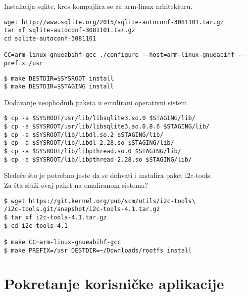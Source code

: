 \documentclass{article}
\begin{document}
Instalacija sqlite, kros kompajlira se za arm-linux arhitekturu.

\begin{commandline}
  \begin{verbatim}
wget http://www.sqlite.org/2015/sqlite-autoconf-3081101.tar.gz
tar xf sqlite-autoconf-3081101.tar.gz
cd sqlite-autoconf-3081101

CC=arm-linux-gnueabihf-gcc ./configure --host=arm-linux-gnueabihf --prefix=/usr
  \end{verbatim}
\end{commandline}

\begin{commandline}
  \begin{verbatim}
$ make DESTDIR=$SYSROOT install
$ make DESTDIR=$STAGING install
  \end{verbatim}
\end{commandline}

Dodavanje neophodnih paketa u emulirani operativni sistem.

\begin{commandline}
  \begin{verbatim}
$ cp -a $SYSROOT/usr/lib/libsqlite3.so.0 $STAGING/lib/
$ cp -a $SYSROOT/usr/lib/libsqlite3.so.0.8.6 $STAGING/lib/
$ cp -a $SYSROOT/lib/libdl.so.2 $STAGING/lib/
$ cp -a $SYSROOT/lib/libdl-2.28.so $STAGING/lib/
$ cp -a $SYSROOT/lib/libpthread.so.0 $STAGING/lib/
$ cp -a $SYSROOT/lib/libpthread-2.28.so $STAGING/lib/
  \end{verbatim}
\end{commandline}



Sledeće što je potrebno jeste da se dohvati i instalira paket i2c-tools. \\

Za šta služi ovaj paket na emuliranom sistemu?

\begin{commandline}
  \begin{verbatim}
$ wget https://git.kernel.org/pub/scm/utils/i2c-tools\
/i2c-tools.git/snapshot/i2c-tools-4.1.tar.gz
$ tar xf i2c-tools-4.1.tar.gz
$ cd i2c-tools-4.1

$ make CC=arm-linux-gnueabihf-gcc
$ make PREFIX=/usr DESTDIR=~/Downloads/rootfs install
  \end{verbatim}
\end{commandline}


\section{Pokretanje korisničke aplikacije}
\end{document}
